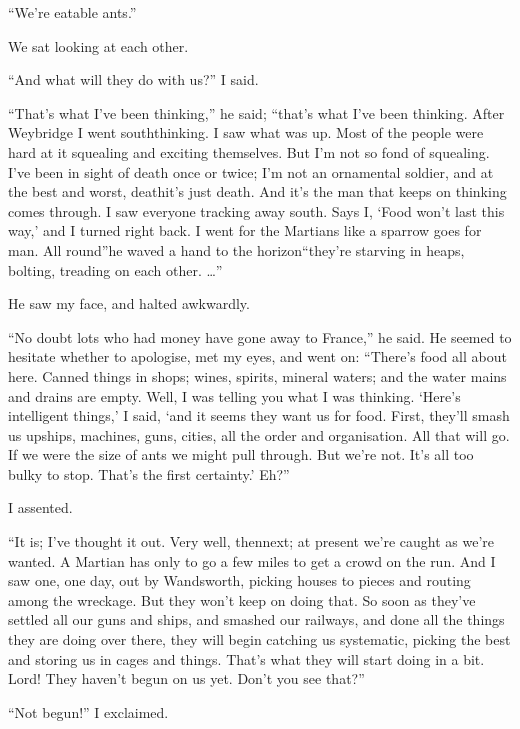 ``We're eatable ants.''

We sat looking at each other.

``And what will they do with us?'' I said.

``That's what I've been thinking,'' he said; ``that's what I've been
thinking. After Weybridge I went south\dash{}thinking. I saw what was
up. Most of the people were hard at it squealing and exciting
themselves. But I'm not so fond of squealing. I've been in sight of
death once or twice; I'm not an ornamental soldier, and at the best
and worst, death\dash{}it's just death. And it's the man that keeps on
thinking comes through. I saw everyone tracking away south. Says I,
`Food won't last this way,' and I turned right back. I went for the
Martians like a sparrow goes for man. All round''\dash{}he waved a hand
to the horizon\dash{}``they're starving in heaps, bolting, treading on
each other. \ldots{}''

He saw my face, and halted awkwardly.

``No doubt lots who had money have gone away to France,'' he said. He
seemed to hesitate whether to apologise, met my eyes, and went on:
``There's food all about here. Canned things in shops; wines,
spirits, mineral waters; and the water mains and drains are empty.
Well, I was telling you what I was thinking. `Here's intelligent
things,' I said, `and it seems they want us for food. First,
they'll smash us up\dash{}ships, machines, guns, cities, all the order
and organisation. All that will go. If we were the size of ants we
might pull through. But we're not. It's all too bulky to stop.
That's the first certainty.' Eh?''

I assented.

``It is; I've thought it out. Very well, then\dash{}next; at present
we're caught as we're wanted. A Martian has only to go a few miles
to get a crowd on the run. And I saw one, one day, out by
Wandsworth, picking houses to pieces and routing among the
wreckage. But they won't keep on doing that. So soon as they've
settled all our guns and ships, and smashed our railways, and done
all the things they are doing over there, they will begin catching
us systematic, picking the best and storing us in cages and things.
That's what they will start doing in a bit. Lord! They haven't
begun on us yet. Don't you see that?''

``Not begun!'' I exclaimed.

